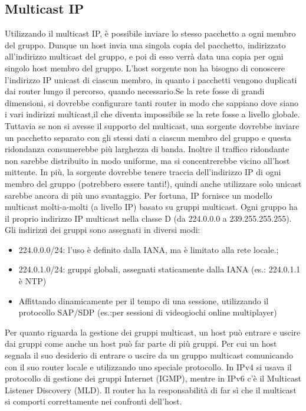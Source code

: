 \subsection{Multicast IP}
Utilizzando il multicast IP, è possibile inviare lo stesso pacchetto a ogni membro del gruppo. Dunque un host invia una singola copia del pacchetto, indirizzato all’indirizzo multicast del gruppo, e poi di esso verrà data una copia per ogni singolo host membro del gruppo. L’host sorgente non ha bisogno di conoscere l’indirizzo IP unicast di ciascun membro, in quanto i pacchetti vengono duplicati dai router lungo il percorso, quando necessario.Se la rete fosse di grandi dimensioni, si dovrebbe configurare tanti router in modo che sappiano dove siano i vari indirizzi multicast,il che diventa impossibile se la rete fosse a livello globale. Tuttavia se non si avesse il supporto del multicast, una sorgente dovrebbe inviare un pacchetto separato con gli stessi dati a ciascun membro del gruppo e questa ridondanza consumerebbe più larghezza di banda. Inoltre il traffico ridondante non sarebbe distribuito in modo uniforme, ma si concentrerebbe vicino all’host mittente. In più, la sorgente dovrebbe tenere traccia dell’indirizzo IP di ogni membro del gruppo (potrebbero essere tanti!), quindi anche utilizzare solo unicast sarebbe ancora di più uno svantaggio. Per fortuna, IP fornisce un modello multicast molti-a-molti (a livello IP) basato su gruppi multicast. Ogni gruppo ha il proprio indirizzo IP multicast nella classe D (da 224.0.0.0 a 239.255.255.255). Gli indirizzi dei gruppi sono assegnati in diversi modi:
\begin{itemize}
  \item 224.0.0.0/24: l’uso è definito dalla IANA, ma è limitato alla rete locale.;
  \item 224.0.1.0/24: gruppi globali, assegnati staticamente dalla IANA (es.: 224.0.1.1 è NTP)
  \item Affittando dinamicamente per il tempo di una sessione, utilizzando il protocollo SAP/SDP (es.:per sessioni di videogiochi online multiplayer)
\end{itemize}
Per quanto riguarda la gestione dei gruppi multicast, un host può entrare e uscire dai gruppi come anche un host può far parte di più gruppi. Per cui un host segnala il suo desiderio di entrare o uscire da un gruppo multicast comunicando con il suo router locale e utilizzando uno speciale protocollo. In IPv4 si usava il protocollo di gestione dei gruppi Internet (IGMP), mentre in IPv6 c’è il Multicast Listener Discovery (MLD). Il router ha la responsabilità di far sì che il multicast si comporti correttamente nei confronti dell’host.
